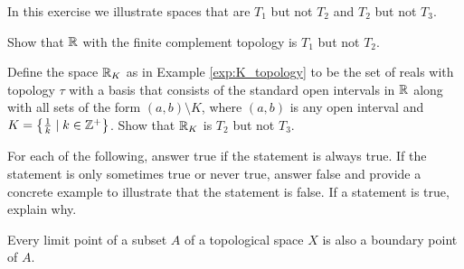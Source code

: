 \item \label{ex:not_T_1_2_3} In this exercise we illustrate spaces that are $T_1$ but not $T_2$ and $T_2$ but not $T_3$.
	\ba
	\item Show that $\mathbb{R}$ with the finite complement topology is $T_1$ but not $T_2$. 
	
	\item Define the space $\mathbb{R}_K$ as in Example \ref{exp:K_topology} to be the set of reals with topology $\tau$ with a basis that consists of the standard open intervals in $\mathbb{R}$ along with all sets of the form $(a,b) \setminus K$, where $(a,b)$ is any open interval and $K = \left\{\frac{1}{k} \mid k \in \mathbb{Z}^+\right\}$. Show that $\mathbb{R}_K$ is $T_2$ but not $T_3$. 
	
	\ea

\begin{comment}

\ExerciseSolution

\ba
	\item Consider $\R$ with the finite complement topology $\tau_{FC}$. If $x,y \in \R$ with $x \neq y$, then let $U = \R \setminus \{x\}$. Since $\R \setminus U = \{x\}$, we have that $U$ is open. Clearly $y \in U$ and $x \notin U$. So $(\R, \tau_{FC})$ is $T_1$. However, if $x, y \in \R$ with $x \neq y$ and $U$ and $V$ are open sets with $x \in U$ and $y \in V$, the fact that $\R \setminus U$ and $\R \setminus V$ are both finite implies that $U \cap V \neq \emptyset$. So $(\R, \tau_{FC})$ is not $T_2$. 

	\item Let $a$ and $b$ be distinct elements in $\R_K$. Without loss of generality, assume $a < b$. Then the open sets $(a-1,a+m)$ and $(b-m, b+1)$ separate $a$ and $b$, where $m = \frac{a+b}{2}$. So $\R_K$ is $T_2$. To demonstrate that $\R_k$ is not $T_3$, we show that $\R_K$ is not regular. Since $(-\infty, \infty) \setminus K$ is an open set, its complement $K$ is a closed set. We will prove that $0$ and $K$ cannot be separated by disjoint open sets. Let $V$ be an open set that contains $0$. Then $0$ is in some open interval $(a,b)$. But there exists $k \in \Z^+$ such that $\frac{1}{k} < b$, so $K \cap V \neq \emptyset$. Therefore, we cannot find disjoint open sets $U$ and $V$ such that $K \subseteq U$ and $0 \in V$. So $\R_K$ is not regular and $\R_K$ is not $T_3$.  

\ea

\end{comment}

\item For each of the following, answer true if the statement is always true. If the statement is only sometimes true or never true, answer false and provide a concrete example to illustrate that the statement is false. If a statement is true, explain why. 
	\ba
	\item Every limit point of a subset $A$ of a topological space $X$ is also a boundary point of $A$. 
	
